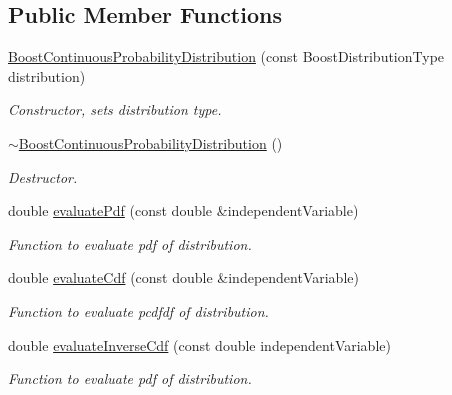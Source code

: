 \subsection*{Public Member Functions}
\begin{DoxyCompactItemize}
\item 
\hyperlink{classtudat_1_1statistics_1_1BoostContinuousProbabilityDistribution_a0c61159df17227b0779b2d0d332cca88}{Boost\+Continuous\+Probability\+Distribution} (const Boost\+Distribution\+Type distribution)
\begin{DoxyCompactList}\small\item\em Constructor, sets distribution type. \end{DoxyCompactList}\item 
\hyperlink{classtudat_1_1statistics_1_1BoostContinuousProbabilityDistribution_abbc8ff7a2def3afb5bc1fba85429147e}{$\sim$\+Boost\+Continuous\+Probability\+Distribution} ()\hypertarget{classtudat_1_1statistics_1_1BoostContinuousProbabilityDistribution_abbc8ff7a2def3afb5bc1fba85429147e}{}\label{classtudat_1_1statistics_1_1BoostContinuousProbabilityDistribution_abbc8ff7a2def3afb5bc1fba85429147e}

\begin{DoxyCompactList}\small\item\em Destructor. \end{DoxyCompactList}\item 
double \hyperlink{classtudat_1_1statistics_1_1BoostContinuousProbabilityDistribution_a4ca43440bd33baebea62c568f0fb5df4}{evaluate\+Pdf} (const double \&independent\+Variable)
\begin{DoxyCompactList}\small\item\em Function to evaluate pdf of distribution. \end{DoxyCompactList}\item 
double \hyperlink{classtudat_1_1statistics_1_1BoostContinuousProbabilityDistribution_aacf2e0c715bddf0618d0af5f8abf8eb9}{evaluate\+Cdf} (const double \&independent\+Variable)
\begin{DoxyCompactList}\small\item\em Function to evaluate pcdfdf of distribution. \end{DoxyCompactList}\item 
double \hyperlink{classtudat_1_1statistics_1_1BoostContinuousProbabilityDistribution_a37b9839a1ea5dd3c71a1f10b5ea65fbb}{evaluate\+Inverse\+Cdf} (const double independent\+Variable)
\begin{DoxyCompactList}\small\item\em Function to evaluate pdf of distribution. \end{DoxyCompactList}\end{DoxyCompactItemize}


